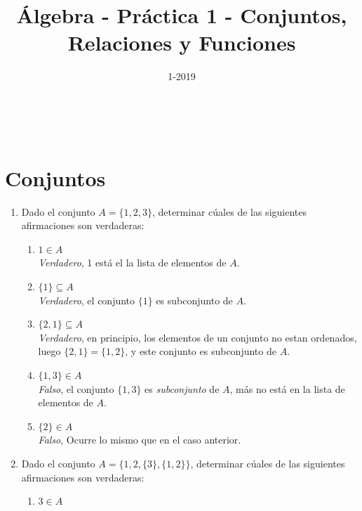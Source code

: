 \documentclass[a4paper,11pt]{article}
\title{Álgebra - Pr\'actica 1 - Conjuntos, Relaciones y Funciones}
\author{}
\date{1-2019}
\makeatletter
\renewcommand{\maketitle}{
\begin{center}
\begin{normalsize}\textbf{\@title}\end{normalsize}\\
\begin{normalsize}\@author\end{normalsize}
\end{center}
}
\makeatother
\begin{document}
\renewcommand{\headrulewidth}{0pt} 			%
\renewcommand{\tablename}{Tabla}
\renewcommand{\figurename}{Fig.}
\renewcommand{\refname}{Bibliograf\'ia y referencias}
\renewcommand{\contentsname}{Tabla de contenido}
\maketitle
\section*{Conjuntos}
    \begin{enumerate}
        \item Dado el conjunto $A=\{1,2,3\}$, determinar c\'uales de las siguientes afirmaciones son verdaderas:
        \begin{enumerate}[label = \roman*)]
            \item $1\in A$\\
                \colorbox{g}{\textit{Verdadero}}, 1 est\'a el la lista de elementos de $A$.
            \item $\{1\}\subseteq A$\\
                \colorbox{g}{\textit{Verdadero}}, el conjunto $\{1\}$ es subconjunto de $A$.
            \item $\{2,1\}\subseteq A$\\
                \colorbox{g}{\textit{Verdadero}}, en principio, los elementos de un conjunto no estan ordenados, luego $\{2,1\}=\{1,2\}$, y este conjunto es subconjunto de $A$.
            \item $\{1,3\}\in A$\\
                \colorbox{g}{\textit{Falso}}, el conjunto $\{1,3\}$ es \textit{subconjunto} de $A$, m\'as no est\'a en la lista de elementos de $A$.
            \item $\{2\}\in A$\\
                \colorbox{g}{\textit{Falso}}, Ocurre lo mismo que en el caso anterior.
        \end{enumerate}
        \item Dado el conjunto $A = \{1,2,\{3\},\{1,2\}\} $, determinar c\'uales de las siguientes afirmaciones son verdaderas:
        \begin{enumerate}[label = \roman*)]
            \item $3\in A$\\

\end{enumerate}
\end{enumerate}
\end{document}
